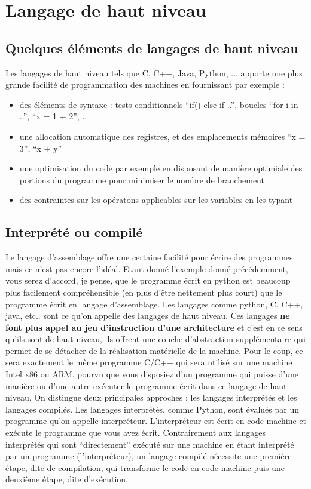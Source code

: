 \section{Langage de haut niveau}


\subsection{Quelques éléments de langages de haut niveau}

Les langages de haut niveau tels que C, C++, Java, Python, ... apporte une plus grande facilité de programmation des machines en fournissant par exemple :
\begin{itemize}
\item des éléments de syntaxe : tests conditionnels ``if() else if ..'', boucles ``for i in ..'', ``x = 1 + 2'', ..
\item une allocation automatique des registres, et des emplacements mémoires ``x = 3'', ``x + y''
\item une optimisation du code par exemple en disposant de manière optimiale des portions du programme pour minimiser le nombre de branchement
\item des contraintes sur les opératons applicables sur les variables en les typant
\end{itemize}


\subsection{Interprété ou compilé}

Le langage d'assemblage offre une certaine facilité pour écrire des programmes mais ce n'est pas encore l'idéal. Etant donné l'exemple donné précédemment, vous serez d'accord, je pense, que le programme écrit en python est beaucoup plus facilement compréhensible (en plus d'être nettement plus court) que le programme écrit en langage d'assemblage. Les langages comme python, C, C++, java, etc.. sont ce qu'on appelle des langages de haut niveau. Ces langages \textbf{ne font plus appel au jeu d'instruction d'une architecture} et c'est en ce sens qu'ils sont de haut niveau, ils offrent une couche d'abstraction supplémentaire qui permet de se détacher de la réalisation matérielle de la machine. Pour le coup, ce sera exactement le même programme C/C++ qui sera utilisé sur une machine Intel x86 ou ARM, pourvu que vous disposiez d'un programme qui puisse d'une manière ou d'une autre exécuter le programme écrit dans ce langage de haut niveau. On distingue deux principales approches : les langages interprétés et les langages compilés. Les langages interprétés, comme Python, sont évalués par un programme qu'on appelle interpréteur. L'interpréteur est écrit en code machine et exécute le programme que vous avez écrit. Contrairement aux langages interprétés qui sont ``directement'' exécuté sur une machine en étant interprété par un programme (l'interpréteur), un langage compilé nécessite une première étape, dite de compilation, qui transforme le code en code machine puis une deuxième étape, dite d'exécution.



